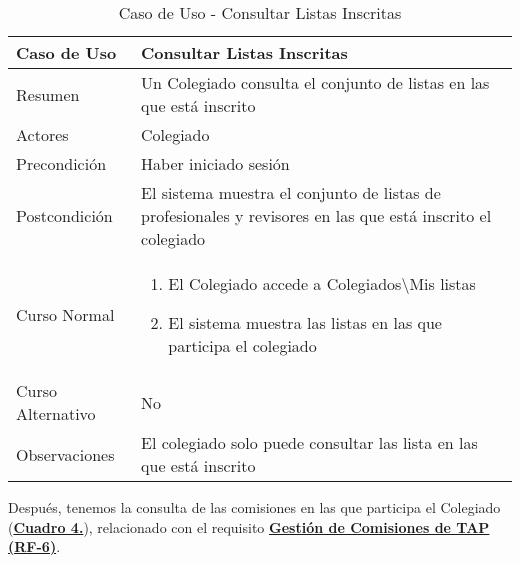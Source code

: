 \begin{table}[!htbp]
  \centering  \addtocounter{casouso}{1}
  \begin{tabular}{|l | p{100mm}|}
    \textbf{Caso de Uso}  & \textbf{Consultar Listas Inscritas} \\ \hline
    Resumen 		 & Un Colegiado consulta el conjunto de listas en las que está inscrito \\ \hline
    Actores  		 & Colegiado \\ \hline
    Precondición  	 & Haber iniciado sesión \\ \hline
    Postcondición  	 & El sistema muestra el conjunto de listas de profesionales y revisores en las que está inscrito el colegiado \\ \hline
    Curso Normal   	 & \begin{enumerate}
	  \item El Colegiado accede a Colegiados\textbackslash Mis listas
	  \item El sistema muestra las listas en las que participa el colegiado
    \end{enumerate}  \\ \hline
    Curso Alternativo  & No  \\ \hline
    Observaciones 	 & El colegiado solo puede consultar las lista en las que está inscrito \\ \hline
  \end{tabular}
  \caption{Caso de Uso  - Consultar Listas Inscritas}
  \label{tab:cucConsultaLista}
\end{table}
\FloatBarrier

\addtocounter{tabla}{1}
Después, tenemos la consulta de las comisiones en las que participa el Colegiado (\textbf{\hyperref[tab:cucConsultaComision]{Cuadro 4.}}), relacionado con el requisito \textbf{\hyperref[tab:rfGestComTAP]{Gestión de Comisiones de TAP (RF-6)}}.

